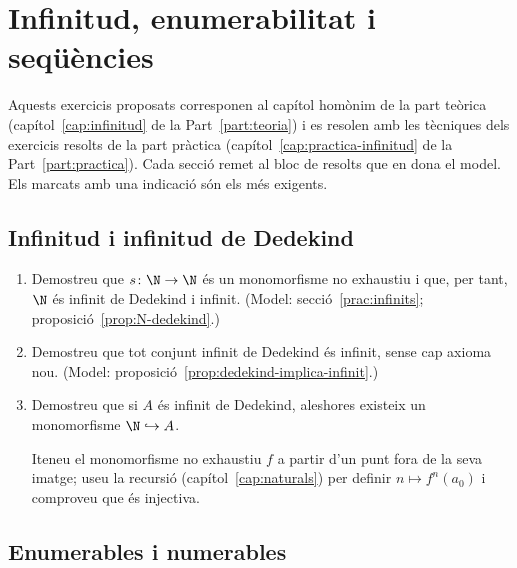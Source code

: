 \chapter{Infinitud, enumerabilitat i seqüències}\label{cap:exercicis-infinitud}

Aquests exercicis proposats corresponen al capítol homònim de la part teòrica (capítol~\ref{cap:infinitud} de la Part~\ref{part:teoria}) i es resolen amb les tècniques dels exercicis resolts de la part pràctica (capítol~\ref{cap:practica-infinitud} de la Part~\ref{part:practica}). Cada secció remet al bloc de resolts que en dona el model. Els marcats amb una indicació són els més exigents.

\section{Infinitud i infinitud de Dedekind}

\begin{enumerate}
  \item Demostreu que \(s\colon\N\to\N\) és un monomorfisme no exhaustiu i que, per tant, \(\N\) és infinit de Dedekind i infinit. (Model: secció~\ref{prac:infinits}; proposició~\ref{prop:N-dedekind}.)

  \item Demostreu que tot conjunt infinit de Dedekind és infinit, sense cap axioma nou. (Model: proposició~\ref{prop:dedekind-implica-infinit}.)

  \item Demostreu que si \(A\) és infinit de Dedekind, aleshores existeix un monomorfisme \(\N\hookrightarrow A\). \begin{indicacio}Iteneu el monomorfisme no exhaustiu \(f\) a partir d'un punt fora de la seva imatge; useu la recursió (capítol~\ref{cap:naturals}) per definir \(n\mapsto f^{n}(a_0)\) i comproveu que és injectiva.\end{indicacio}
\end{enumerate}

\section{Enumerables i numerables}

